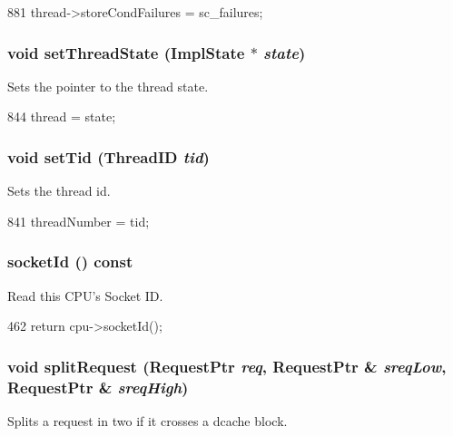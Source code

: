 \begin{DoxyCode}
881     { thread->storeCondFailures = sc_failures; }
\end{DoxyCode}
\hypertarget{classBaseDynInst_a65bbd70cc4e254a52befad10cc6a6f9a}{
\subsubsection[{setThreadState}]{\setlength{\rightskip}{0pt plus 5cm}void setThreadState ({\bf ImplState} $\ast$ {\em state})}}
\label{classBaseDynInst_a65bbd70cc4e254a52befad10cc6a6f9a}
Sets the pointer to the thread state. 


\begin{DoxyCode}
844 { thread = state; }
\end{DoxyCode}
\hypertarget{classBaseDynInst_ad1c2ae5b668e7024fd2b0f956aefaa4e}{
\subsubsection[{setTid}]{\setlength{\rightskip}{0pt plus 5cm}void setTid ({\bf ThreadID} {\em tid})}}
\label{classBaseDynInst_ad1c2ae5b668e7024fd2b0f956aefaa4e}
Sets the thread id. 


\begin{DoxyCode}
841 { threadNumber = tid; }
\end{DoxyCode}
\hypertarget{classBaseDynInst_a1ff97b43199001357718671a4d922d12}{
\subsubsection[{socketId}]{ socketId () const}}
\label{classBaseDynInst_a1ff97b43199001357718671a4d922d12}
Read this CPU's Socket ID. 


\begin{DoxyCode}
462 { return cpu->socketId(); }
\end{DoxyCode}
\hypertarget{classBaseDynInst_aa1b0c0798d6520eb2c1bf3334cee01c5}{
\subsubsection[{splitRequest}]{\setlength{\rightskip}{0pt plus 5cm}void splitRequest ({\bf RequestPtr} {\em req}, \/  {\bf RequestPtr} \& {\em sreqLow}, \/  {\bf RequestPtr} \& {\em sreqHigh})}}
\label{classBaseDynInst_aa1b0c0798d6520eb2c1bf3334cee01c5}
Splits a request in two if it crosses a dcache block. 


